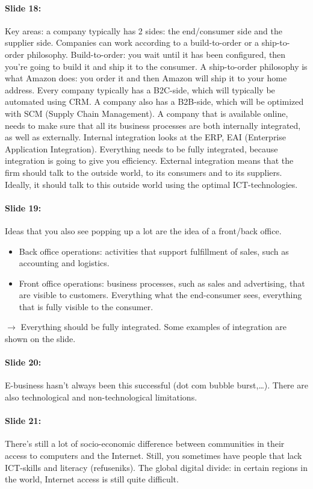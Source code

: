 \documentclass[10pt,a4paper]{report}
\begin{document}
\paragraph{Slide 18:}Key areas: a company typically has 2 sides: the end/consumer side and the supplier side. Companies can work according to a build-to-order or a ship-to-order philosophy. Build-to-order: you wait until it has been configured, then you're going to build it and ship it to the consumer. A ship-to-order philosophy is what Amazon does: you order it and then Amazon will ship it to your home address. Every company typically has a B2C-side, which will typically be automated using CRM. A company also has a B2B-side, which will be optimized with SCM (Supply Chain Management). A company that is available online, needs to make sure that all its business processes are both internally integrated, as well as externally. Internal integration looks at the ERP, EAI (Enterprise Application Integration). Everything needs to be fully integrated, because integration is going to give you efficiency. External integration means that the firm should talk to the outside world, to its consumers and to its suppliers. Ideally, it should talk to this outside world using the optimal ICT-technologies.

\paragraph{Slide 19:}Ideas that you also see popping up a lot are the idea of a front/back office.
\begin{itemize}
\item Back office operations: activities that support fulfillment of sales, such as accounting and logistics. 
\item Front office operations: business processes, such as sales and advertising, that are visible to customers.  Everything what the end-consumer sees, everything that is fully visible to the consumer.
\end{itemize}
$\rightarrow$ Everything should be fully integrated. Some examples of integration are shown on the slide.

\paragraph{Slide 20:}E-business hasn’t always been this successful (dot com bubble burst,…). There are also technological and non-technological limitations.

\paragraph{Slide 21:}There's still a lot of socio-economic difference between communities in their access to computers and the Internet. Still, you sometimes have people that lack ICT-skills and literacy (refuseniks). The global digital divide: in certain regions in the world, Internet access is still quite difficult. 
\end{document}
